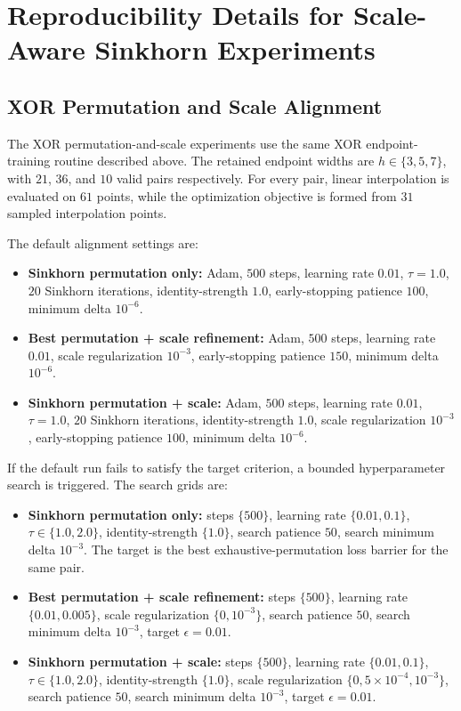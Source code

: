 \documentclass[11pt,a4paper]{report}
\begin{document}
\section{Reproducibility Details for Scale-Aware Sinkhorn Experiments}
\label{app:sinkhorn_scale_repro}

\subsection{XOR Permutation and Scale Alignment}
\label{app:sinkhorn_scale_repro_xor}

The XOR permutation-and-scale experiments use the same XOR endpoint-training routine described above. The retained endpoint widths are \(h \in \{3,5,7\}\), with \(21\), \(36\), and \(10\) valid pairs respectively. For every pair, linear interpolation is evaluated on \(61\) points, while the optimization objective is formed from \(31\) sampled interpolation points.

The default alignment settings are:
\begin{itemize}
    \item \textbf{Sinkhorn permutation only:} Adam, \(500\) steps, learning rate \(0.01\), \(\tau=1.0\), \(20\) Sinkhorn iterations, identity-strength \(1.0\), early-stopping patience \(100\), minimum delta \(10^{-6}\).
    \item \textbf{Best permutation + scale refinement:} Adam, \(500\) steps, learning rate \(0.01\), scale regularization \(10^{-3}\), early-stopping patience \(150\), minimum delta \(10^{-6}\).
    \item \textbf{Sinkhorn permutation + scale:} Adam, \(500\) steps, learning rate \(0.01\), \(\tau=1.0\), \(20\) Sinkhorn iterations, identity-strength \(1.0\), scale regularization \(10^{-3}\), early-stopping patience \(100\), minimum delta \(10^{-6}\).
\end{itemize}

If the default run fails to satisfy the target criterion, a bounded hyperparameter search is triggered. The search grids are:
\begin{itemize}
    \item \textbf{Sinkhorn permutation only:} steps \(\{500\}\), learning rate \(\{0.01,0.1\}\), \(\tau \in \{1.0,2.0\}\), identity-strength \(\{1.0\}\), search patience \(50\), search minimum delta \(10^{-3}\). The target is the best exhaustive-permutation loss barrier for the same pair.
    \item \textbf{Best permutation + scale refinement:} steps \(\{500\}\), learning rate \(\{0.01,0.005\}\), scale regularization \(\{0,10^{-3}\}\), search patience \(50\), search minimum delta \(10^{-3}\), target \(\epsilon=0.01\).
    \item \textbf{Sinkhorn permutation + scale:} steps \(\{500\}\), learning rate \(\{0.01,0.1\}\), \(\tau \in \{1.0,2.0\}\), identity-strength \(\{1.0\}\), scale regularization \(\{0,5\times10^{-4},10^{-3}\}\), search patience \(50\), search minimum delta \(10^{-3}\), target \(\epsilon=0.01\).
\end{itemize}
\end{document}
